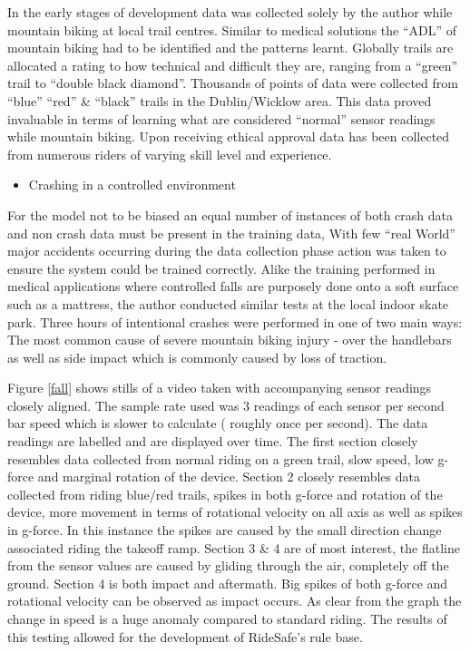 In the early stages of development data was collected solely by the author while mountain biking at local trail centres. Similar to medical solutions the “ADL” of mountain biking had to be identified and the patterns learnt. Globally trails are allocated a rating to how technical and difficult they are, ranging from a “green” trail to “double black diamond”. Thousands of points of data were collected from “blue” “red” \& “black” trails in the Dublin/Wicklow area. This data proved invaluable in terms of learning what are considered “normal” sensor readings while mountain biking. Upon receiving ethical approval data has been collected from numerous riders of varying skill level and experience.
\begin{itemize}
\item Crashing in a controlled environment
\end{itemize}
For the model not to be biased an equal number of instances of both crash data and non crash data must be present in the training data, With few “real World” major accidents occurring during the data collection phase action was taken to ensure the system could be trained correctly. Alike the training performed in medical applications where controlled falls are purposely done onto a soft surface such as a mattress, the author conducted similar tests at the local indoor skate park.
Three hours of intentional crashes were performed in one of two main ways: The most common cause of severe mountain biking injury - over the handlebars as well as side impact which is commonly caused by loss of traction.    







Figure \ref{fall} shows stills of a video taken with accompanying sensor readings closely aligned. The sample rate used was 3 readings of each sensor per second bar speed which is slower to calculate ( roughly once per second). The data readings are labelled and are displayed over time.
 The first section closely resembles data collected from normal riding on a green trail, slow speed, low g-force and marginal rotation of the device. 
Section 2 closely resembles data collected from riding blue/red trails, spikes in both g-force and rotation of the device, more movement in terms of rotational velocity on all axis as well as spikes in g-force. In this instance the spikes are caused by the small direction change associated riding the takeoff ramp.
Section 3 \& 4 are of most interest, the flatline from the sensor values are caused by gliding through the air, completely off the ground. Section 4 is both impact and aftermath. Big spikes of both g-force and rotational velocity can be observed as impact occurs. As clear from the graph the change in speed is a huge anomaly compared to standard riding. The results of this testing allowed for the development of RideSafe’s rule base.

